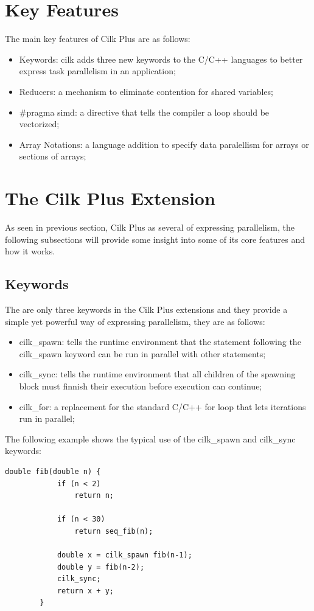 \documentclass[a4paper,10pt,openright,openbib,twocolumn]{article}
\begin{document}
\section{Key Features} \label{key}

The main key features of Cilk Plus are as follows:
\begin{itemize}
    \item Keywords: cilk adds three new keywords to the C/C++ languages to better express task parallelism in an application;
    \item Reducers: a mechanism to eliminate contention for shared variables;
    \item \#pragma simd: a directive that tells the compiler a loop should be vectorized;
    \item Array Notations: a language addition to specify data paralellism for arrays or sections of arrays;
\end{itemize}


\section{The Cilk Plus Extension} \label{extension}

As seen in previous section, Cilk Plus as several of expressing parallelism, the following subsections will provide some insight into some of its core features and how it works.

\subsection {Keywords} 
The are only three keywords in the Cilk Plus extensions and they provide a simple yet powerful way of expressing parallelism, they are as follows:
\begin{itemize}
    \item cilk\_spawn: tells the runtime environment that the statement following the cilk\_spawn keyword can be run in parallel with other statements;
    \item cilk\_sync: tells the runtime environment that all children of the spawning block must finnish their execution before execution can continue;
    \item cilk\_for: a replacement for the standard C/C++ for loop that lets iterations run in parallel; 
\end{itemize}
The following example shows the typical use of the cilk\_spawn and cilk\_sync keywords:
\begin{minipage}{.45\textwidth}
    \begin{lstlisting}[caption=Computation of the nth Fibonacci Number using Cilk Plus]
        double fib(double n) {
            if (n < 2)
                return n;

            if (n < 30)
                return seq_fib(n);

            double x = cilk_spawn fib(n-1);
            double y = fib(n-2);
            cilk_sync;
            return x + y;
        }
    \end{lstlisting}
\end{minipage}
\end{document}
